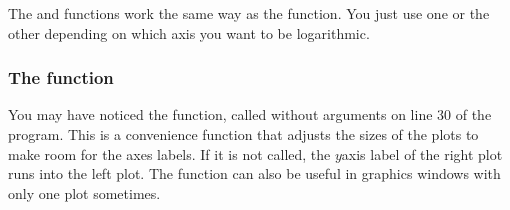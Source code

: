 \documentclass[letterpaper,10pt,english]{sphinxmanual}
\begin{document}
\begin{sphinxVerbatim}[commandchars=\\\{\},numbers=left,firstnumber=1,stepnumber=1]
  
   
   


\end{sphinxVerbatim}

\sphinxAtStartPar
The  and  functions work the same way as the  function.  You just use one or the other depending on which axis you want to be logarithmic.


\subsubsection{The  function}
\label{\detokenize{chap5/chap5_plot:the-tight-layout-function}}
\ignorespaces 
\sphinxAtStartPar
You may have noticed the  function, called without arguments on line 30 of the program.  This is a convenience function that adjusts the sizes of the plots to make room for the axes labels.  If it is not called, the \(y\)\sphinxhyphen{}axis label of the right plot runs into the left plot.  The  function can also be useful in graphics windows with only one plot sometimes.
\end{document}
